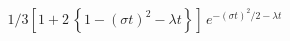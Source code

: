 \documentclass[12pt]{article}
\begin{document}
\begin{displaymath}
1/3 \left[ 1 + 2\, \left\{ 1 - (\sigma t)^2 - \lambda t\right\}\right]\, e^{-(\sigma t)^2/2 - \lambda t}
\end{displaymath}
\end{document}
